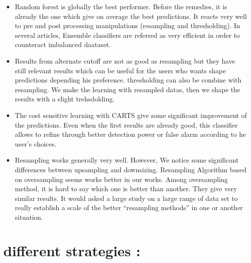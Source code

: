 \documentclass[
]{report}
\begin{document}
\begin{itemize}
\item
  Random forest is globally the best performer. Before the remedies, it is already the one which give on average the best predictions. It reacts very well to pre and post processing manipulations (resampling and thresholding). In several articles, Ensemble classifiers are referred as very efficient in order to counteract imbalanced daataset.\citep{survey}
\item
  Results from alternate cutoff are not as good as resampling but they have still relevant results which can be useful for the users who wants shape predictions depending his preference. thresholding can also be combine with resampling. We make the learning with resampled datas, then we shape the results with a slight trehsdolding.
\item
  The cost sensitive learning with CARTS give some significant improvement of the predictions. Even when the first results are already good, this classifier allows to refine through better detection power or false alarm according to he user's choices.
\item
  Resampling works generally very well. However, We notice some significant differences between upsampling and downsizing. Resampling Algorithm based on oversampling seems works better in our works.
  Among oversampling method, it is hard to say which one is better than another. They give very similar results. It would asked a large study on a large range of data set to really establish a scale of the better ``resampling methods'' in one or another situation.
\end{itemize}

\hypertarget{different-strategies}{%
\section{different strategies :}\label{different-strategies}}
\end{document}

